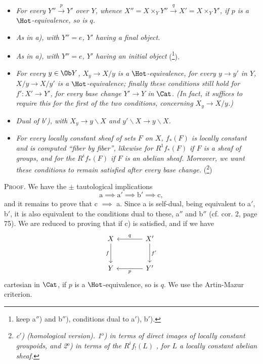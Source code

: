 \begin{itemize}[leftmargin=3em]
\item[\textit{a)}] \textit{For every $Y'' \xrightarrow{p} Y'$ over $Y$, whence $X'' = X \times_Y Y'' \xrightarrow{q} X' = X \times_Y Y'$, if $p$ is a} $\Hot$\textit{-equivalence, so is $q$.}

\item[\textit{a$'$)}] \textit{As in a), with $Y'' = e$, $Y'$ having a final object.}

\item[\textit{a$''$)}] \textit{As in a), with $Y'' = e$, $Y'$ having an initial object} (\footnote{keep a$''$) and b$''$), conditions dual to a$'$), b$'$).})\textit{.}

\item[\textit{b$'$)}] \textit{For every $y \in \Ob Y$, $X_y \longrightarrow X/y$ is a} $\Hot$\textit{-equivalence, for every $y \longrightarrow y'$ in $Y$, $X/y \longrightarrow X/y'$ is a} $\Hot$\textit{-equivalence; finally these conditions still hold for $f' : X' \longrightarrow Y'$, for every base change $Y' \longrightarrow Y$ in} $\Cat$\textit{. (In fact, it suffices to require this for the first of the two conditions, concerning $X_y \longrightarrow X/y$.)}

\item[\textit{b$''$)}] \textit{Dual of b$'$), with $X_y \longrightarrow y\backslash X$ and $y'\backslash X \longrightarrow y\backslash X$.}

\item[\textit{c)}] \textit{For every locally constant sheaf of sets $F$ on $X$, $f_*(F)$ is locally constant and is computed ``fiber by fiber'', likewise for $R^1 f_*(F)$ if $F$ is a sheaf of groups, and for the $R^i f_*(F)$ if $F$ is an abelian sheaf. Moreover, we want these conditions to remain satisfied after every base change.} (\footnote{\textit{c$'$) (homological version). 1$^o$) in terms of direct images of locally constant groupoids, and 2$^o$) in terms of the $R^i f_!(L)$} \textit{, for $L$ a locally constant abelian sheaf.}})
\end{itemize}

\noindent\textsc{Proof}. We have the $\pm$ tautological implications
\[
\mathrm{a} \implies \mathrm{a}' \implies \mathrm{b}' \implies \mathrm{c},
\]
and it remains to prove that c $\implies$ a. Since a is self-dual, being equivalent to a$'$, b$'$, it is also equivalent to the conditions dual to these, a$''$ and b$''$ (cf. cor. 2, page 75). We are reduced to proving that if c) is satisfied, and if we have
\[
\begin{tikzcd}[row sep=large, column sep=large]
X \arrow[d, "f"'] & X' \arrow[l, "q"'] \arrow[d, "f'"] \\
Y & Y' \arrow[l, "p"]
\end{tikzcd}
\]
cartesian in $\Cat$, if $p$ is a $\Hot$-equivalence, so is $q$. We use the Artin-Mazur criterion.

